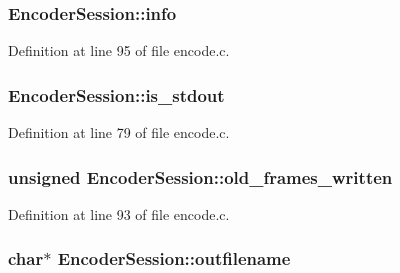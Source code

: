 \subsubsection[{\texorpdfstring{info}{info}}]{ Encoder\+Session\+::info}\hypertarget{struct_encoder_session_a66685cdbc1c3fbf6e7cd6c46ac68e4c0}{}\label{struct_encoder_session_a66685cdbc1c3fbf6e7cd6c46ac68e4c0}


Definition at line 95 of file encode.\+c.

\subsubsection[{\texorpdfstring{is\+\_\+stdout}{is_stdout}}]{ Encoder\+Session\+::is\+\_\+stdout}\hypertarget{struct_encoder_session_a277e1f653dd103fd863cf6abf1762d80}{}\label{struct_encoder_session_a277e1f653dd103fd863cf6abf1762d80}


Definition at line 79 of file encode.\+c.

\subsubsection[{\texorpdfstring{old\+\_\+frames\+\_\+written}{old_frames_written}}]{\setlength{\rightskip}{0pt plus 5cm}unsigned Encoder\+Session\+::old\+\_\+frames\+\_\+written}\hypertarget{struct_encoder_session_a337f0f4a200c751fdb551125a760d060}{}\label{struct_encoder_session_a337f0f4a200c751fdb551125a760d060}


Definition at line 93 of file encode.\+c.

\subsubsection[{\texorpdfstring{outfilename}{outfilename}}]{ char$\ast$ Encoder\+Session\+::outfilename}\hypertarget{struct_encoder_session_a96753d59c83c0849e6d2a89b2041aea7}{}\label{struct_encoder_session_a96753d59c83c0849e6d2a89b2041aea7}


